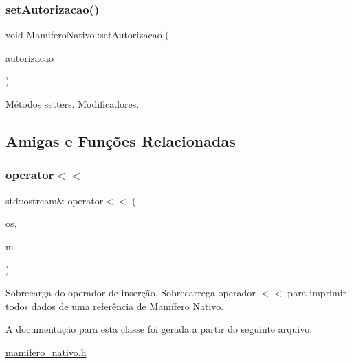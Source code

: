 \subsubsection{\texorpdfstring{set\+Autorizacao()}{setAutorizacao()}}
{\footnotesize\ttfamily void Mamifero\+Nativo\+::set\+Autorizacao (\begin{DoxyParamCaption}\item[{std\+::string}]{autorizacao }\end{DoxyParamCaption})}

Métodos setters. Modificadores. 

\subsection{Amigas e Funções Relacionadas}
\mbox{\label{classMamiferoNativo_a563bbb0977b08a10ba7273aa5cee79c4}} 
\subsubsection{\texorpdfstring{operator$<$$<$}{operator<<}}
{\footnotesize\ttfamily std\+::ostream\& operator$<$$<$ (\begin{DoxyParamCaption}\item[{std\+::ostream \&}]{os,  }\item[{\hyperlink{classMamiferoNativo}{Mamifero\+Nativo} \&}]{m }\end{DoxyParamCaption})\hspace{0.3cm}{\ttfamily [friend]}}

Sobrecarga do operador de inserção. Sobrecarrega operador $<$$<$ para imprimir todos dados de uma referência de Mamífero Nativo. 

A documentação para esta classe foi gerada a partir do seguinte arquivo\+:\begin{DoxyCompactItemize}
\item 
\hyperlink{mamifero__nativo_8h}{mamifero\+\_\+nativo.\+h}\end{DoxyCompactItemize}
